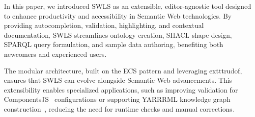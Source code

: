 %
%
%
%
%

In this paper, we introduced SWLS as an extensible, editor-agnostic tool designed to enhance productivity and accessibility in Semantic Web technologies. By providing autocompletion, validation, highlighting, and contextual documentation, SWLS streamlines ontology creation, SHACL shape design, SPARQL query formulation, and sample data authoring, benefiting both newcomers and experienced users.

The modular architecture, built on the ECS pattern and leveraging 	exttt{rudof}, ensures that SWLS can evolve alongside Semantic Web advancements. This extensibility enables specialized applications, such as improving validation for ComponentsJS~\cite{01GPAWNQ5ZS2DAY0J9JMPQHM9C} configurations or supporting YARRRML knowledge graph construction~\cite{Heyvaert2018Declarative}, reducing the need for runtime checks and manual corrections.

